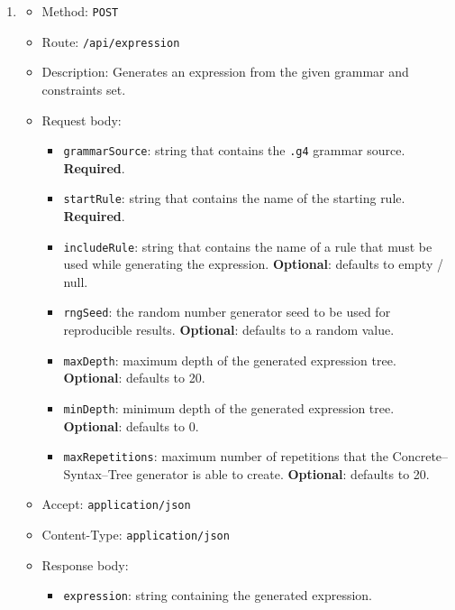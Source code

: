 \documentclass[]{usiinfbachelorproject}
\begin{document}
\begin{enumerate}
\item \begin{itemize}
      \item Method: \texttt{POST}
      \item Route: \texttt{/api/expression}
      \item Description: Generates an expression from the given grammar and
            constraints set.
      \item Request body: 
            \begin{itemize}
            \item \texttt{grammarSource}: string that contains the \texttt{.g4}
                  grammar source. \textbf{Required}.
            \item \texttt{startRule}: string that contains the name of the
                  starting rule. \textbf{Required}.
            \item \texttt{includeRule}: string that contains the name of a
                  rule that must be used while generating the expression.
                  \textbf{Optional}: defaults to empty / null.
            \item \texttt{rngSeed}: the random number generator seed to be
                  used for reproducible results. \textbf{Optional}: defaults
                  to a random value.
            \item \texttt{maxDepth}: maximum depth of the generated expression
                  tree. \textbf{Optional}: defaults to 20.
            \item \texttt{minDepth}: minimum depth of the generated expression
                  tree. \textbf{Optional}: defaults to 0.
            \item \texttt{maxRepetitions}: maximum number of repetitions
                  that the Concrete–Syntax–Tree generator is able to create.
                  \textbf{Optional}: defaults to 20.
      \end{itemize}
      \item Accept: \texttt{application/json}
      \item Content-Type: \texttt{application/json}
      \item Response body:
            \begin{itemize}
            \item \texttt{expression}: string containing the generated
                  expression.
            \end{itemize}
      \end{itemize}

\end{enumerate}
\end{document}
